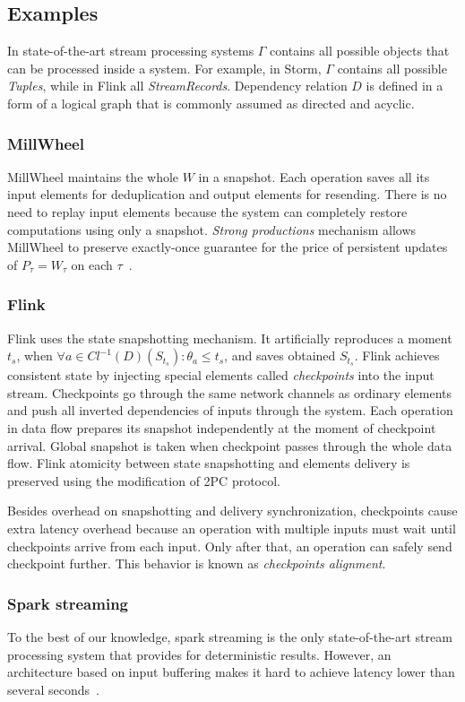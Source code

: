 \subsection{Examples}

In state-of-the-art stream processing systems $\Gamma$ contains all possible objects that can be processed inside a system. For example, in Storm, $\Gamma$ contains all possible {\em Tuples}, while in Flink all {\em StreamRecords}. Dependency relation $D$ is defined in a form of a logical graph that is commonly assumed as directed and acyclic.

\subsubsection{MillWheel}

MillWheel maintains the whole $W$ in a snapshot. Each operation saves all its input elements for deduplication and output elements for resending. There is no need to replay input elements because the system can completely restore computations using only a snapshot. {\em Strong productions} mechanism allows MillWheel to preserve exactly-once guarantee for the price of persistent updates of $P_\tau=W_\tau$ on each $\tau$~\cite{Akidau:2013:MFS:2536222.2536229}.    

\subsubsection{Flink}

Flink uses the state snapshotting mechanism. It artificially reproduces a moment $t_s$, when $\forall{a}\in{Cl^{-1}(D)(S_{t_s})}:\theta_a \leq t_s$, and saves obtained $S_{t_s}$. Flink achieves consistent state by injecting special elements called {\em checkpoints} into the input stream. Checkpoints go through the same network channels as ordinary elements and push all inverted dependencies of inputs through the system. Each operation in data flow prepares its snapshot independently at the moment of checkpoint arrival. Global snapshot is taken when checkpoint passes through the whole data flow. Flink atomicity between state snapshotting and elements delivery is preserved using the modification of 2PC protocol.

Besides overhead on snapshotting and delivery synchronization, checkpoints cause extra latency overhead because an operation with multiple inputs must wait until checkpoints arrive from each input. Only after that, an operation can safely send checkpoint further. This behavior is known as {\em checkpoints alignment}.

\subsubsection{Spark streaming}

To the best of our knowledge, spark streaming is the only state-of-the-art stream processing system that provides for deterministic results. However, an architecture based on input buffering makes it hard to achieve latency lower than several seconds~\cite{7530084, 7474816}. 